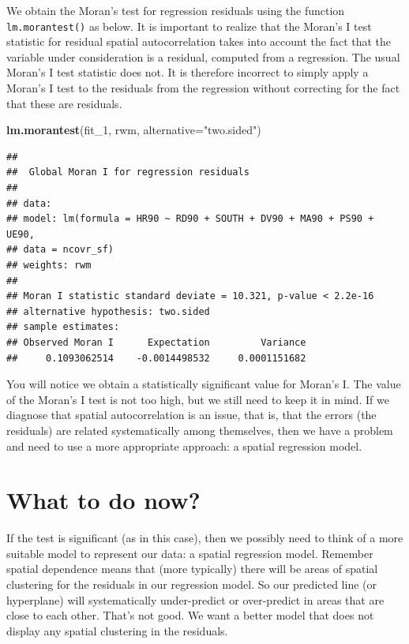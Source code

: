 \documentclass[]{book}
\newenvironment{Shaded}{\begin{snugshade}}{\end{snugshade}}
\newcommand{\DataTypeTok}[1]{\textcolor[rgb]{0.13,0.29,0.53}{#1}}
\newcommand{\DecValTok}[1]{\textcolor[rgb]{0.00,0.00,0.81}{#1}}
\newcommand{\KeywordTok}[1]{\textcolor[rgb]{0.13,0.29,0.53}{\textbf{#1}}}
\newcommand{\NormalTok}[1]{#1}
\newcommand{\StringTok}[1]{\textcolor[rgb]{0.31,0.60,0.02}{#1}}
\begin{document}
We obtain the Moran's test for regression residuals using the function \texttt{lm.morantest()} as below. It is important to realize that the Moran's I test statistic for residual spatial autocorrelation takes into account the fact that the variable under consideration is a residual, computed from a regression. The usual Moran's I test statistic does not. It is therefore incorrect to simply apply a Moran's I test to the residuals from the regression without correcting for the fact that these are residuals.

\begin{Shaded}
\begin{Highlighting}[]
\KeywordTok{lm.morantest}\NormalTok{(fit_}\DecValTok{1}\NormalTok{, rwm, }\DataTypeTok{alternative=}\StringTok{"two.sided"}\NormalTok{)}
\end{Highlighting}
\end{Shaded}

\begin{verbatim}
## 
##  Global Moran I for regression residuals
## 
## data:  
## model: lm(formula = HR90 ~ RD90 + SOUTH + DV90 + MA90 + PS90 + UE90,
## data = ncovr_sf)
## weights: rwm
## 
## Moran I statistic standard deviate = 10.321, p-value < 2.2e-16
## alternative hypothesis: two.sided
## sample estimates:
## Observed Moran I      Expectation         Variance 
##     0.1093062514    -0.0014498532     0.0001151682
\end{verbatim}

You will notice we obtain a statistically significant value for Moran's I. The value of the Moran's I test is not too high, but we still need to keep it in mind. If we diagnose that spatial autocorrelation is an issue, that is, that the errors (the residuals) are related systematically among themselves, then we have a problem and need to use a more appropriate approach: a spatial regression model.

\hypertarget{what-to-do-now}{%
\section{What to do now?}\label{what-to-do-now}}

If the test is significant (as in this case), then we possibly need to think of a more suitable model to represent our data: a spatial regression model. Remember spatial dependence means that (more typically) there will be areas of spatial clustering for the residuals in our regression model. So our predicted line (or hyperplane) will systematically under-predict or over-predict in areas that are close to each other. That's not good. We want a better model that does not display any spatial clustering in the residuals.
\end{document}
